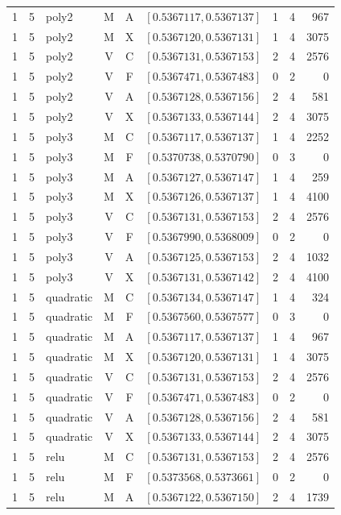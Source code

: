 \begin{longtable}{r r l c c l r r r}
1 & 5 & poly2 & M & A & $[0.5367117,0.5367137]$ & 1 & 4 & 967 \\
1 & 5 & poly2 & M & X & $[0.5367120,0.5367131]$ & 1 & 4 & 3075 \\
1 & 5 & poly2 & V & C & $[0.5367131,0.5367153]$ & 2 & 4 & 2576 \\
1 & 5 & poly2 & V & F & $[0.5367471,0.5367483]$ & 0 & 2 & 0 \\
1 & 5 & poly2 & V & A & $[0.5367128,0.5367156]$ & 2 & 4 & 581 \\
1 & 5 & poly2 & V & X & $[0.5367133,0.5367144]$ & 2 & 4 & 3075 \\
1 & 5 & poly3 & M & C & $[0.5367117,0.5367137]$ & 1 & 4 & 2252 \\
1 & 5 & poly3 & M & F & $[0.5370738,0.5370790]$ & 0 & 3 & 0 \\
1 & 5 & poly3 & M & A & $[0.5367127,0.5367147]$ & 1 & 4 & 259 \\
1 & 5 & poly3 & M & X & $[0.5367126,0.5367137]$ & 1 & 4 & 4100 \\
1 & 5 & poly3 & V & C & $[0.5367131,0.5367153]$ & 2 & 4 & 2576 \\
1 & 5 & poly3 & V & F & $[0.5367990,0.5368009]$ & 0 & 2 & 0 \\
1 & 5 & poly3 & V & A & $[0.5367125,0.5367153]$ & 2 & 4 & 1032 \\
1 & 5 & poly3 & V & X & $[0.5367131,0.5367142]$ & 2 & 4 & 4100 \\
1 & 5 & quadratic & M & C & $[0.5367134,0.5367147]$ & 1 & 4 & 324 \\
1 & 5 & quadratic & M & F & $[0.5367560,0.5367577]$ & 0 & 3 & 0 \\
1 & 5 & quadratic & M & A & $[0.5367117,0.5367137]$ & 1 & 4 & 967 \\
1 & 5 & quadratic & M & X & $[0.5367120,0.5367131]$ & 1 & 4 & 3075 \\
1 & 5 & quadratic & V & C & $[0.5367131,0.5367153]$ & 2 & 4 & 2576 \\
1 & 5 & quadratic & V & F & $[0.5367471,0.5367483]$ & 0 & 2 & 0 \\
1 & 5 & quadratic & V & A & $[0.5367128,0.5367156]$ & 2 & 4 & 581 \\
1 & 5 & quadratic & V & X & $[0.5367133,0.5367144]$ & 2 & 4 & 3075 \\
1 & 5 & relu & M & C & $[0.5367131,0.5367153]$ & 2 & 4 & 2576 \\
1 & 5 & relu & M & F & $[0.5373568,0.5373661]$ & 0 & 2 & 0 \\
1 & 5 & relu & M & A & $[0.5367122,0.5367150]$ & 2 & 4 & 1739 \\

\end{longtable}

